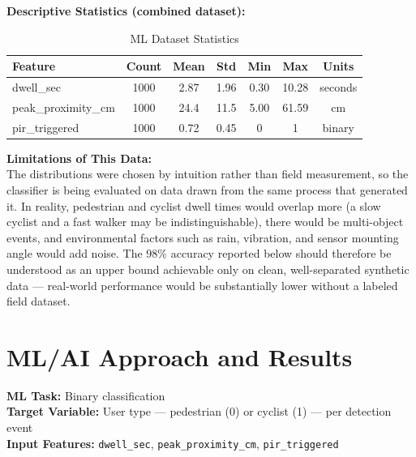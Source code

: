 \documentclass[11pt]{article}
\begin{document}
\noindent\textbf{Descriptive Statistics (combined dataset):}

\begin{table}[htbp]
\centering
\caption{ML Dataset Statistics}
\begin{tabular}{@{}lcccccc@{}}
\toprule
\textbf{Feature} & \textbf{Count} & \textbf{Mean} & \textbf{Std} & \textbf{Min} & \textbf{Max} & \textbf{Units} \\
\midrule
dwell\_sec          & 1000 & 2.87 & 1.96 & 0.30 & 10.28 & seconds \\
peak\_proximity\_cm & 1000 & 24.4 & 11.5 & 5.00 & 61.59 & cm \\
pir\_triggered      & 1000 & 0.72 & 0.45 & 0    & 1     & binary \\
\bottomrule
\end{tabular}
\end{table}

\noindent\textbf{Limitations of This Data:}\\{}
The distributions were chosen by intuition rather than field measurement, so the classifier is being evaluated on data drawn from the same process that generated it. In reality, pedestrian and cyclist dwell times would overlap more (a slow cyclist and a fast walker may be indistinguishable), there would be multi-object events, and environmental factors such as rain, vibration, and sensor mounting angle would add noise. The 98\% accuracy reported below should therefore be understood as an upper bound achievable only on clean, well-separated synthetic data --- real-world performance would be substantially lower without a labeled field dataset.

\section{ML/AI Approach and Results}
\label{sec:ml}

\noindent\textbf{ML Task:} Binary classification\\
\textbf{Target Variable:} User type --- pedestrian (0) or cyclist (1) --- per detection event\\
\textbf{Input Features:} \texttt{dwell\_sec}, \texttt{peak\_proximity\_cm}, \texttt{pir\_triggered}

\vspace{0.5em}
\end{document}
